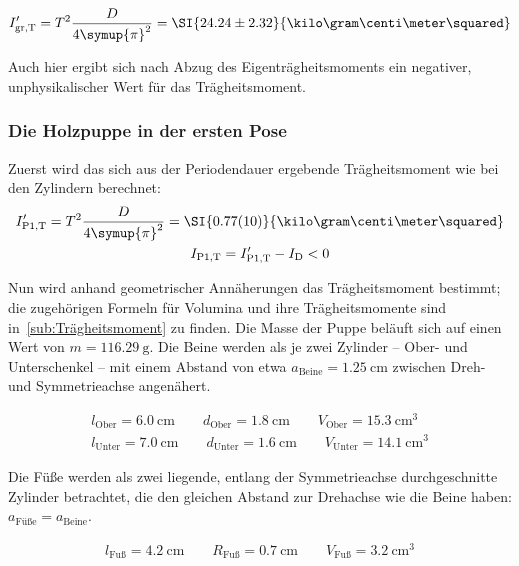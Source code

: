 \begin{gather}
    I'_\text{gr,T}=T^2\frac{D}{4\symup{\pi}^2}=\SI{24.24\pm2.32}{\kilo\gram\centi\meter\squared} 
\end{gather}

Auch hier ergibt sich nach Abzug des Eigenträgheitsmoments ein negativer, unphysikalischer Wert für das Trägheitsmoment. 

\FloatBarrier
\subsubsection{Die Holzpuppe in der ersten Pose}

Zuerst wird das sich aus der Periodendauer ergebende Trägheitsmoment wie bei den Zylindern berechnet: 
\begin{gather}
    I'_\text{P1,T}=T^2\frac{D}{4\symup{\pi}^2}=\SI{0.77(10)}{\kilo\gram\centi\meter\squared} \\
    I_\text{P1,T}=I'_\text{P1,T}-I_\text{D} <0 
\end{gather}

Nun wird anhand geometrischer Annäherungen das Trägheitsmoment bestimmt; die zugehörigen Formeln für Volumina und ihre 
Trägheitsmomente sind in~\ref{sub:Trägheitsmoment} zu finden. 
Die Masse der Puppe beläuft sich auf einen Wert von ${m=\SI{116.29}{\gram}}$. 
Die Beine werden als je zwei Zylinder -- Ober- und Unterschenkel -- mit einem Abstand von etwa 
${a_\text{Beine}=\SI{1.25}{\centi\meter}}$ zwischen Dreh- und Symmetrieachse angenähert.  

\begin{gather}
    l_\text{Ober}=\SI{6.0}{\centi\meter} \quad \quad
    d_\text{Ober}=\SI{1.8}{\centi\meter} \quad \quad
    V_\text{Ober}=\SI{15.3}{\centi\meter\tothe{3}} \\
    l_\text{Unter}=\SI{7.0}{\centi\meter} \quad \quad
    d_\text{Unter}=\SI{1.6}{\centi\meter} \quad \quad
    V_\text{Unter}=\SI{14.1}{\centi\meter\tothe{3}} 
\end{gather}

Die Füße werden als zwei liegende, entlang der Symmetrieachse durchgeschnitte Zylinder betrachtet, die den gleichen 
Abstand zur Drehachse wie die Beine haben: ${a_\text{Füße}=a_\text{Beine}}$. 

\begin{gather}
    l_\text{Fuß}=\SI{4.2}{\centi\meter} \quad \quad 
    R_\text{Fuß}=\SI{0.7}{\centi\meter} \quad \quad
    V_\text{Fuß}=\SI{3.2}{\centi\meter\tothe{3}}
\end{gather}

